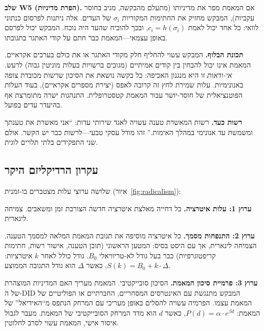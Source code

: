 \documentclass[11pt,a4paper,twocolumn]{article}
\begin{document}
\textbf{שלב W5 (הפרת מדיניות).} אם המאמת מפר את מדיניותו (מתעלם מהבקשה, מגיב בחוסר עקביות), המבקש מחזיק את החתימות המקוריות $\sigma_i$ של העדים. אלה ניתנות לפרסום כנתוני לוואי: כל אחד יכול לאמת $c_i = h(\sigma_i)$, ובכך להוכיח שהעד היה נוכח. המבקש יכול לפרסם באופן עצמאי---המאמת כבר חתם על קודי האתגר בתגובתו.

\textbf{תכונת הבלוף.} המבקש עשוי להחליף חלק מקודי האתגר או את כולם בערכים אקראיים. המאמת אינו יכול להבחין בין קודים אמיתיים (מגובים ברשויות בעלות מוניטין גבוה) לרעש. \emph{אי-ודאות} זו היא מנגנון האכיפה: כל בקשה נושאת את הסיכון שרשות מכובדת צופה באנונימיות. עלות שמירת לחץ זה קרובה לאפס (יצירת מספרים אקראיים), בעוד העלות הפוטנציאלית של חוסר-יושר עבור המאמת קטסטרופלית. התנהגות ישרה מתומרצת אף בהיעדר עדים בפועל.

\textbf{רשות כעד.} רשות המאשרת טענה עשויה לאגד שירותי עדות: ``אני מאשרת את טענתך ומשמשת עד אנונימי במהלך האימות.'' זהו מודל עסקי טבעי---לרשות כבר יש הקשר. אולם שני התפקידים בלתי תלויים לוגית.

\subsection{עקרון הרדיקליזם היקר}

שלושה ערוצי עלות מצטברים בו-זמנית (איור~\ref{fig:radicalism}):

\textbf{ערוץ 1: עלות איטרציה.} כל דחייה מאלצת איטרציה חדשה הצורכת זמן ומשאבים. צמיחה לינארית.

\textbf{ערוץ 2: התנפחות מסמך.} כל איטרציה מוסיפה את תגובת המאמת המלאה למסמך הטענה. הצמיחה לינארית, אך עם היסט בסיס: המטען הראשוני (תוכן הטענה, אישור רשות, חתימות קריפטוגרפיות) כבר בעל גודל לא-טריוויאלי $B_0$. גודל כולל לאחר $k$ איטרציות: $S(k) = B_0 + k \cdot \Delta$, כאשר $\Delta$ הוא גודל התגובה הממוצע.

\textbf{ערוץ 3: פרמיית סיכון המאמת.} הסיכון סובייקטיבי. המאמת מעריך האם המדיניות המוצהרת של ה-DID המבקש מתנגשת עם האינטרסים המסחריים, החברתיים או הפוליטיים של המאמת עצמו. הפרמיה עשויה להסלים באופן מעריכי עם המרחק הנתפס מ``האידיאל'' של המאמת: $P(d) = \alpha \cdot e^{\beta d}$, כאשר $d$ הוא מדד המרחק הסובייקטיבי של המאמת. מעבר לגבול איסור אישי, המאמת עשוי לסרב לחלוטין.
\end{document}
